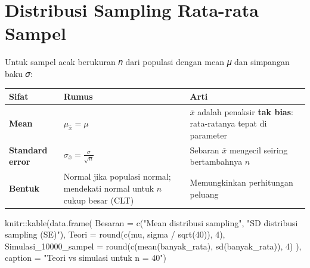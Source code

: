 \documentclass[
  indonesian,
  letterpaper,
]{book}
\newenvironment{Shaded}{\begin{snugshade}}{\end{snugshade}}
\newcommand{\AttributeTok}[1]{\textcolor[rgb]{0.40,0.45,0.13}{#1}}
\newcommand{\DecValTok}[1]{\textcolor[rgb]{0.68,0.00,0.00}{#1}}
\newcommand{\FunctionTok}[1]{\textcolor[rgb]{0.28,0.35,0.67}{#1}}
\newcommand{\NormalTok}[1]{\textcolor[rgb]{0.00,0.23,0.31}{#1}}
\newcommand{\SpecialCharTok}[1]{\textcolor[rgb]{0.37,0.37,0.37}{#1}}
\newcommand{\StringTok}[1]{\textcolor[rgb]{0.13,0.47,0.30}{#1}}
\newcounter{none} %
\begin{document}

\chapter{Distribusi Sampling Rata-rata
Sampel}\label{distribusi-sampling-rata-rata-sampel}

Untuk sampel acak berukuran 𝑛 dari populasi dengan mean 𝜇 dan simpangan
baku 𝜎:

{\def\LTcaptype{none} %
\begin{longtable}[]{@{}
  >{\raggedright\arraybackslash}p{}
  >{\raggedright\arraybackslash}p{}
  >{\raggedright\arraybackslash}p{}@{}}
\toprule\noalign{}
\begin{minipage}[b]{\linewidth}\raggedright
Sifat
\end{minipage} & \begin{minipage}[b]{\linewidth}\raggedright
Rumus
\end{minipage} & \begin{minipage}[b]{\linewidth}\raggedright
Arti
\end{minipage} \\
\midrule\noalign{}
\endhead
\bottomrule\noalign{}
\endlastfoot
\textbf{Mean} & \(\mu_{\bar{x}} = \mu\) & \(\bar{x}\) adalah penaksir
\textbf{tak bias}: rata-ratanya tepat di parameter \\
\textbf{Standard error} & \(\sigma_{\bar{x}} = \frac{\sigma}{\sqrt{n}}\)
& Sebaran \(\bar{x}\) mengecil seiring bertambahnya \(n\) \\
\textbf{Bentuk} & Normal jika populasi normal; mendekati normal untuk
\(n\) cukup besar (CLT) & Memungkinkan perhitungan peluang \\
\end{longtable}
}

\begin{Shaded}
\begin{Highlighting}[]
\NormalTok{knitr}\SpecialCharTok{::}\FunctionTok{kable}\NormalTok{(}\FunctionTok{data.frame}\NormalTok{(}
\AttributeTok{Besaran =} \FunctionTok{c}\NormalTok{(}\StringTok{"Mean distribusi sampling"}\NormalTok{, }\StringTok{"SD distribusi sampling (SE)"}\NormalTok{),}
\AttributeTok{Teori =} \FunctionTok{round}\NormalTok{(}\FunctionTok{c}\NormalTok{(mu, sigma }\SpecialCharTok{/} \FunctionTok{sqrt}\NormalTok{(}\DecValTok{40}\NormalTok{)), }\DecValTok{4}\NormalTok{),}
\AttributeTok{Simulasi\_10000\_sampel =} \FunctionTok{round}\NormalTok{(}\FunctionTok{c}\NormalTok{(}\FunctionTok{mean}\NormalTok{(banyak\_rata), }\FunctionTok{sd}\NormalTok{(banyak\_rata)), }\DecValTok{4}\NormalTok{)}
\NormalTok{), }\AttributeTok{caption =} \StringTok{"Teori vs simulasi untuk n = 40"}\NormalTok{)}
\end{Highlighting}
\end{Shaded}
\end{document}
